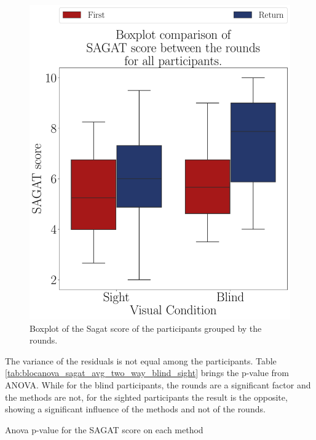 \begin{figure}[!htb]
    \centering
    \includegraphics[width = 0.75\linewidth]{3 - Resultados//Figuras/boxplot_sagat_4_rounds.pdf}
    \caption{Boxplot of the Sagat score of the participants grouped by the rounds.}
    \label{fig:boxplot_sagat_4_rounds}
\end{figure}

The variance of the residuals is not equal among the participants. Table \ref{tab:blocanova_sagat_avg_two_way_blind_sight} brings the p-value from ANOVA. While for the blind participants, the rounds are a significant factor and the methods are not, for the sighted participants the result is the opposite, showing a significant influence of the methods and not of the rounds.

\begin{table}[!htb]
    \caption{Anova p-value for the SAGAT score on each method}
    \label{tab:blocanova_sagat_avg_two_way_blind_sight}
\begin{minipage}{0.45\linewidth}
    
\end{minipage}%
\begin{minipage}{0.05\linewidth}
    \hfill
\end{minipage}%
\begin{minipage}{0.45\linewidth}
        
\end{minipage}
\end{table}